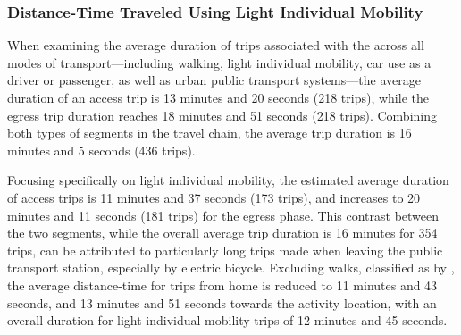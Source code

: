 \begin{refsegment}
\subsubsection*{Distance-Time Traveled Using Light Individual Mobility
    \label{chap5:distances-temps-parcourues}
    }

When examining the average duration of trips associated with the  across all modes of transport—including walking, light individual mobility, car use as a driver or passenger, as well as urban public transport systems—the average duration of an access trip is 13 minutes and 20 seconds (218 trips), while the egress trip duration reaches 18 minutes and 51 seconds (218 trips). Combining both types of segments in the travel chain, the average trip duration is 16 minutes and 5 seconds (436 trips).%
  
Focusing specifically on light individual mobility, the estimated average duration of access trips is 11 minutes and 37 seconds (173 trips), and increases to 20 minutes and 11 seconds (181 trips) for the egress phase. This contrast between the two segments, while the overall average trip duration is 16 minutes for 354 trips, can be attributed to particularly long trips made when leaving the public transport station, especially by electric bicycle. Excluding walks, classified as  by \textcolor{blue}{\textcite[8-9]{hook_undirected_2021}}, the average distance-time for trips from home is reduced to 11 minutes and 43 seconds, and 13 minutes and 51 seconds towards the activity location, with an overall duration for light individual mobility trips of 12 minutes and 45 seconds.%


\end{refsegment}
